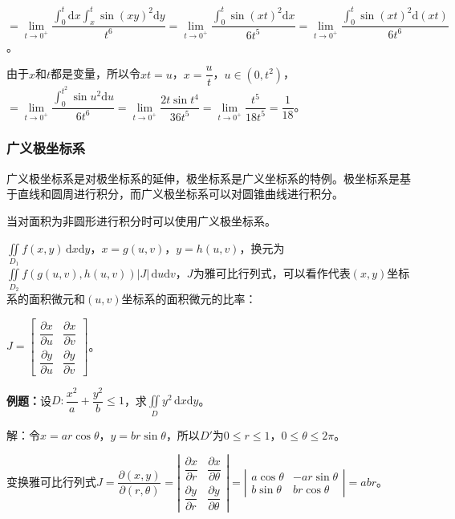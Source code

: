 \documentclass[UTF8, 12pt]{ctexart}
\begin{document}
$=\lim\limits_{t\to0^+}\dfrac{\int_0^t\textrm{d}x\int_x^t\sin(xy)^2\textrm{d}y}{t^6}=\lim\limits_{t\to0^+}\dfrac{\int_0^t\sin(xt)^2\textrm{d}x}{6t^5}=\lim\limits_{t\to0^+}\dfrac{\int_0^t\sin(xt)^2\textrm{d}(xt)}{6t^6}$。

由于$x$和$t$都是变量，所以令$xt=u$，$x=\dfrac{u}{t}$，$u\in(0,t^2)$，$=\lim\limits_{t\to0^+}\dfrac{\int_0^{t^2}\sin u^2\textrm{d}u}{6t^6}=\lim\limits_{t\to0^+}\dfrac{2t\sin t^4}{36t^5}=\lim\limits_{t\to0^+}\dfrac{t^5}{18t^5}=\dfrac{1}{18}$。

\subsubsection{广义极坐标系}

广义极坐标系是对极坐标系的延伸，极坐标系是广义坐标系的特例。极坐标系是基于直线和圆周进行积分，而广义极坐标系可以对圆锥曲线进行积分。

当对面积为非圆形进行积分时可以使用广义极坐标系。

$\iint\limits_{D_1}f(x,y)\,\textrm{d}x\textrm{d}y$，$x=g(u,v)$，$y=h(u,v)$，换元为$\iint\limits_{D_2}f(g(u,v),h(u,v))\vert J\vert\,\textrm{d}u\textrm{d}v$，$J$为雅可比行列式，可以看作代表$(x,y)$坐标系的面积微元和$(u,v)$坐标系的面积微元的比率：

$J=\left[\begin{array}{cc}
    \dfrac{\partial x}{\partial u} & \dfrac{\partial x}{\partial v} \\
    \dfrac{\partial y}{\partial u} & \dfrac{\partial y}{\partial v}
\end{array}\right]$。

\textbf{例题：}设$D:\dfrac{x^2}{a}+\dfrac{y^2}{b}\leqslant1$，求$\iint\limits_Dy^2\,\textrm{d}x\textrm{d}y$。

解：令$x=ar\cos\theta$，$y=br\sin\theta$，所以$D'$为$0\leqslant r\leqslant 1$，$0\leqslant\theta\leqslant2\pi$。

变换雅可比行列式$J=\dfrac{\partial(x,y)}{\partial(r,\theta)}=\left\vert\begin{array}{cc}
    \dfrac{\partial x}{\partial r} & \dfrac{\partial x}{\partial\theta} \\
    \dfrac{\partial y}{\partial r} & \dfrac{\partial y}{\partial\theta}
\end{array}\right\vert=\left\vert\begin{array}{cc}
    a\cos\theta & -ar\sin\theta \\
    b\sin\theta & br\cos\theta
\end{array}\right\vert=abr$。
\end{document}
